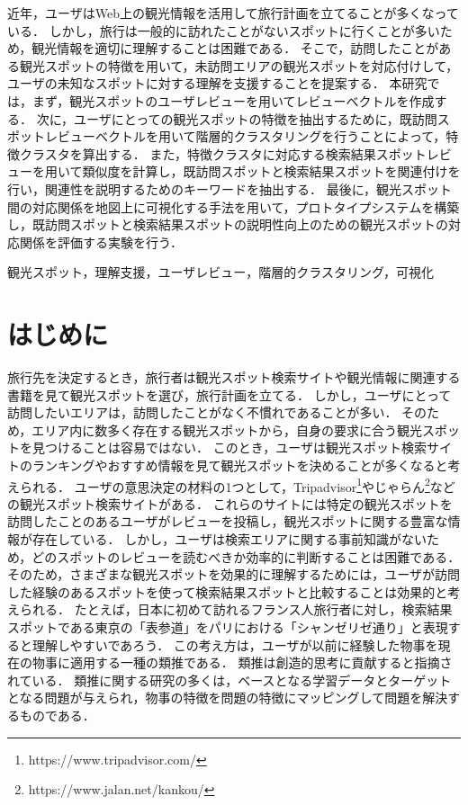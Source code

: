 \documentclass{deimj}
\begin{document}
\pagestyle{empty}
\begin{jabstract}
近年，ユーザはWeb上の観光情報を活用して旅行計画を立てることが多くなっている．
しかし，旅行は一般的に訪れたことがないスポットに行くことが多いため，観光情報を適切に理解することは困難である．
そこで，訪問したことがある観光スポットの特徴を用いて，未訪問エリアの観光スポットを対応付けして，ユーザの未知なスポットに対する理解を支援することを提案する．
本研究では，まず，観光スポットのユーザレビューを用いてレビューベクトルを作成する．
次に，ユーザにとっての観光スポットの特徴を抽出するために，既訪問スポットレビューベクトルを用いて階層的クラスタリングを行うことによって，特徴クラスタを算出する．
また，特徴クラスタに対応する検索結果スポットレビューを用いて類似度を計算し，既訪問スポットと検索結果スポットを関連付けを行い，関連性を説明するためのキーワードを抽出する．
最後に，観光スポット間の対応関係を地図上に可視化する手法を用いて，プロトタイプシステムを構築し，既訪問スポットと検索結果スポットの説明性向上のための観光スポットの対応関係を評価する実験を行う．

\end{jabstract}

\begin{jkeyword}
観光スポット，理解支援，ユーザレビュー，階層的クラスタリング，可視化
\end{jkeyword}
\maketitle

\section{はじめに}
\label{sec:はじめに}
旅行先を決定するとき，旅行者は観光スポット検索サイトや観光情報に関連する書籍を見て観光スポットを選び，旅行計画を立てる．
しかし，ユーザにとって訪問したいエリアは，訪問したことがなく不慣れであることが多い．
そのため，エリア内に数多く存在する観光スポットから，自身の要求に合う観光スポットを見つけることは容易ではない．
このとき，ユーザは観光スポット検索サイトのランキングやおすすめ情報を見て観光スポットを決めることが多くなると考えられる．
ユーザの意思決定の材料の1つとして，Tripadvisor\footnote{https://www.tripadvisor.com/}やじゃらん\footnote{https://www.jalan.net/kankou/}などの観光スポット検索サイトがある．
これらのサイトには特定の観光スポットを訪問したことのあるユーザがレビューを投稿し，観光スポットに関する豊富な情報が存在している．
しかし，ユーザは検索エリアに関する事前知識がないため，どのスポットのレビューを読むべきか効率的に判断することは困難である．
そのため，さまざまな観光スポットを効果的に理解するためには，ユーザが訪問した経験のあるスポットを使って検索結果スポットと比較することは効果的と考えられる．
たとえば，日本に初めて訪れるフランス人旅行者に対し，検索結果スポットである東京の「表参道」をパリにおける「シャンゼリゼ通り」と表現すると理解しやすいであろう．
この考え方は，ユーザが以前に経験した物事を現在の物事に適用する一種の類推である\cite{Gentner}．
類推は創造的思考に貢献すると指摘されている\cite{Holyoak}．
類推に関する研究の多くは，ベースとなる学習データとターゲットとなる問題が与えられ，物事の特徴を問題の特徴にマッピングして問題を解決するもの\cite{Gick}である．
\end{document}

